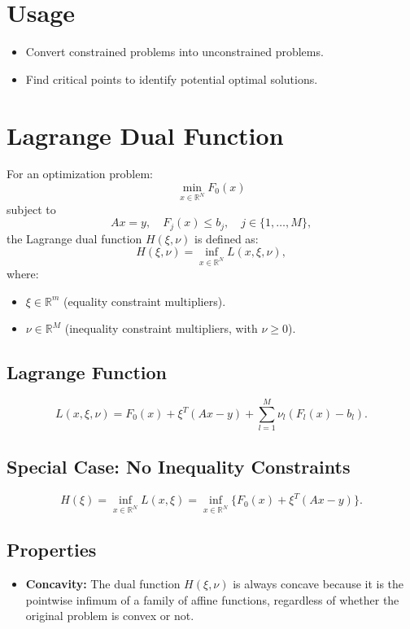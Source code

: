 \documentclass{article}
\begin{document}
\section*{Usage}
\begin{itemize}
    \item Convert constrained problems into unconstrained problems.
    \item Find critical points to identify potential optimal solutions.
\end{itemize}






\section*{Lagrange Dual Function}

For an optimization problem:
\[
\min_{x \in \mathbb{R}^N} F_0(x)
\]
subject to 
\[
Ax = y, \quad F_j(x) \leq b_j, \quad j \in \{1, \ldots, M\},
\]
the Lagrange dual function \(H(\xi, \nu)\) is defined as:
\[
H(\xi, \nu) = \inf_{x \in \mathbb{R}^N} L(x, \xi, \nu),
\]
where:
\begin{itemize}
    \item \(\xi \in \mathbb{R}^m\) (equality constraint multipliers).
    \item \(\nu \in \mathbb{R}^M\) (inequality constraint multipliers, with \(\nu \geq 0\)).
\end{itemize}

\subsection*{Lagrange Function}
\[
L(x, \xi, \nu) = F_0(x) + \xi^T(Ax - y) + \sum_{l=1}^{M} \nu_l (F_l(x) - b_l).
\]

\subsection*{Special Case: No Inequality Constraints}
\[
H(\xi) = \inf_{x \in \mathbb{R}^N} L(x, \xi) = \inf_{x \in \mathbb{R}^N} \{ F_0(x) + \xi^T(Ax - y) \} .
\]

\subsection*{Properties}
\begin{itemize}
    \item \textbf{Concavity:} The dual function \(H(\xi, \nu)\) is always concave because it is the pointwise infimum of a family of affine functions, regardless of whether the original problem is convex or not.
\end{itemize}
\end{document}
